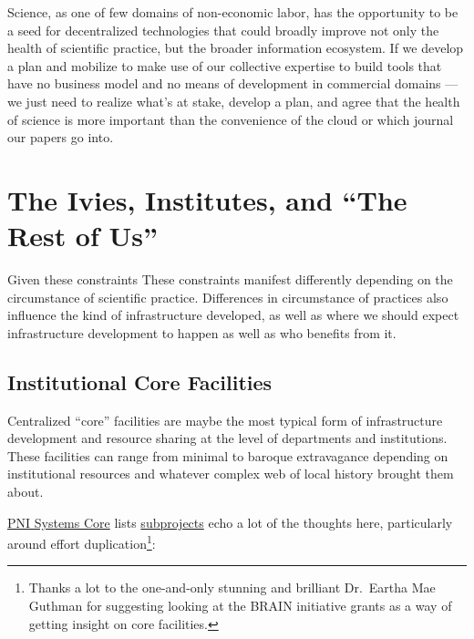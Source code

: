 \documentclass[notoc]{tufte-book}
\begin{document}
Science, as one of few domains of non-economic labor, has the
opportunity to be a seed for decentralized technologies that could
broadly improve not only the health of scientific practice, but the
broader information ecosystem. If we develop a plan and mobilize to make
use of our collective expertise to build tools that have no business
model and no means of development in commercial domains --- we just need
to realize what's at stake, develop a plan, and agree that the health of
science is more important than the convenience of the cloud or which
journal our papers go into. 




\section{The Ivies, Institutes, and ``The Rest of
Us''}



 Given these constraints These constraints manifest
differently depending on the circumstance of scientific practice.
Differences in circumstance of practices also influence the kind of
infrastructure developed, as well as where we should expect
infrastructure development to happen as well as who benefits from it.


\subsection{Institutional Core
Facilities}

Centralized ``core'' facilities are maybe the most typical form of
infrastructure development and resource sharing at the level of
departments and institutions. These facilities can range from minimal to
baroque extravagance depending on institutional resources and whatever
complex web of local history brought them about.

\href{https://projectreporter.nih.gov/project_info_details.cfm?aid=9444124}{PNI
Systems Core} lists
\href{https://reporter.nih.gov/project-details/9444124\#sub-Projects}{subprojects}
echo a lot of the thoughts here, particularly around effort
duplication\footnote{Thanks a lot to the one-and-only stunning and
  brilliant Dr.~Eartha Mae Guthman for suggesting looking at the BRAIN
  initiative grants as a way of getting insight on core facilities.}:
\end{document}
